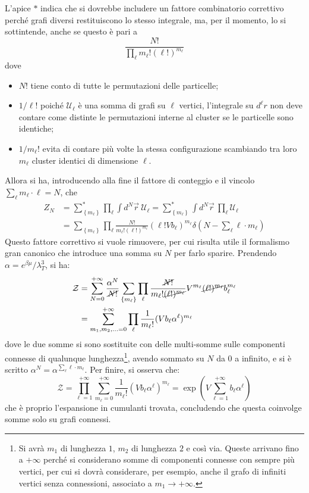 \documentclass[11pt, a4paper]{scrartcl}
\theoremstyle{style}
\theoremstyle{style1}
\numberwithin{equation}{subsection}
\begin{document}
L'apice $*$ indica che si dovrebbe includere un fattore combinatorio correttivo perch\'e grafi diversi restituiscono lo stesso integrale, ma, per il momento, lo si sottintende, anche se questo \`e pari a 
\[
\frac{N!}{\prod_\ell m_\ell !(\ell !)^{m_\ell } }
\] 
dove
\begin{itemize}
	\item $N!$ tiene conto di tutte le permutazioni delle particelle;
	\item $1/\ell!$ poiché $\mathcal{U}_\ell$ è una somma di grafi su $\ell$ vertici, l'integrale su $d^\ell r$ non deve contare come distinte le permutazioni interne al cluster se le particelle sono identiche;
	\item $1/m_\ell!$ evita di contare più volte la stessa configurazione scambiando tra loro $m_\ell$ cluster identici di dimensione $\ell$.
\end{itemize}
Allora si ha, introducendo alla fine il fattore di conteggio e il vincolo $\sum_{\ell }^{} m_\ell \cdot \ell =N$, che
\[
	\begin{split}
		Z_N &= \sum_{\left\{ m_\ell  \right\} }^{*} \prod_\ell \int d^N \vec{r}  \ \mathcal{U} _\ell  = \sum_{\left\{ m_\ell  \right\}}^{*} \int d^N \vec{r} \ \prod _\ell \mathcal{U} _\ell \\
		    &= \sum_{\left\{ m_\ell  \right\} } \prod_\ell \frac{N!}{m_\ell !(\ell !)^{m_\ell } }\left(\ell ! V b_\ell \right) ^{m_\ell } \delta \left(N - \sum_{\ell }^{} \ell \cdot m_\ell \right) 
	\end{split}
\] 
Questo fattore correttivo si vuole rimuovere, per cui risulta utile il formalismo gran canonico che introduce una somma su $N$ per farlo sparire.
Prendendo $\alpha  = e^{\beta \mu }/\lambda _T^3$, si ha:
\[
	\begin{split}
		\mathcal{Z}  &= \sum_{N=0}^{+\infty} \frac{\alpha ^N}{\cancel{N!}}\sum_{\left\{ m_\ell  \right\}}^{} \prod_\ell \frac{\cancel{N!}}{m_\ell ! \cancel{(\ell !)^{m_\ell } }}V^{m_\ell } \cancel{(\ell !)^{m_\ell }} b_\ell ^{m_\ell } \\
			     &= \sum_{m_1,m_2,\ldots = 0} ^{+\infty} \prod_\ell \frac{1}{m_\ell !}(Vb_\ell \alpha ^\ell )^{m_\ell }  
	\end{split}
\] 
dove le due somme si sono sostituite con delle multi-somme sulle componenti connesse di qualunque lunghezza\footnote{Si avr\`a $m_1$ di lunghezza $1$, $m_2$ di lunghezza $2$ e cos\`i via. Queste arrivano fino a $+\infty$ perch\'e si considerano somme di componenti connesse con sempre pi\`u vertici, per cui si dovr\`a considerare, per esempio, anche il grafo di infiniti vertici senza connessioni, associato a $m_1\to +\infty$.}, avendo sommato su $N$ da $0$ a infinito, e si \`e scritto $\alpha^N = \alpha ^{\sum_{\ell }^{} \ell \cdot m_\ell }  $.
Per finire, si osserva che:
\[
\mathcal{Z}  = \prod_{\ell =1} ^{+\infty} \sum_{m_\ell =0}^{+\infty} \frac{1}{m_\ell !} \left(Vb_\ell \alpha ^\ell \right) ^{m_\ell } = \exp \left(V \sum_{\ell =1}^{+\infty} b_\ell \alpha ^\ell \right) 
\] 
che \`e proprio l'espansione in cumulanti trovata, concludendo che questa coinvolge somme solo su grafi connessi.
\end{document}
